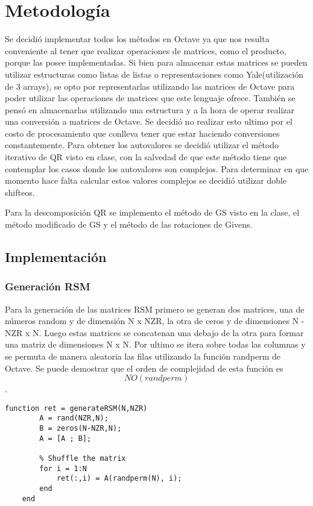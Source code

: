 \documentclass[a4paper,10pt]{article}
\begin{document}
\section{Metodología}
Se decidió implementar todos los métodos en Octave ya que nos resulta conveniente al tener que realizar operaciones de matrices, como el producto, porque las posee implementadas.
Si bien para almacenar estas matrices se pueden utilizar estructuras como listas de listas o representaciones como Yale(utilización de 3 arrays), se opto por representarlas utilizando las matrices de Octave para poder utilizar las operaciones de matrices que este lenguaje ofrece. También se pensó en almacenarlas utilizando una estructura y a la hora de operar realizar una conversión a matrices de Octave. Se decidió no realizar esto ultimo por el costo de procesamiento que conlleva tener que estar haciendo conversiones constantemente.
Para obtener los autovalores se decidió utilizar el método iterativo de QR visto en clase, con la salvedad de que este método tiene que contemplar los casos donde los autovalores son complejos. Para determinar en que momento hace falta calcular estos valores complejos se decidió utilizar doble shifteos. 

Para la descomposición QR se implemento el método de GS visto en la clase, el método modificado de GS y el método de las rotaciones de Givens.

\subsection{Implementación}
\subsubsection{Generación RSM}

Para la generación de las matrices RSM primero se generan dos matrices, una de números random y de dimensión N x NZR, la otra de ceros y de dimensiones N - NZR x N.
Luego estas matrices se concatenan una debajo de la otra para formar una matriz de dimensiones N x N. Por ultimo se itera sobre todas las columnas y se permuta de manera aleatoria las filas utilizando la función randperm de Octave.
Se puede demostrar que el orden de complejidad de esta función es \[N  O ( randperm ) \].

\begin{lstlisting}[caption = Implementación del generador de matrices RSM]
	function ret = generateRSM(N,NZR)
		A = rand(NZR,N);
		B = zeros(N-NZR,N);
		A = [A ; B];

		% Shuffle the matrix
		for i = 1:N
			ret(:,i) = A(randperm(N), i);
		end
	end
\end{lstlisting}
\end{document}
